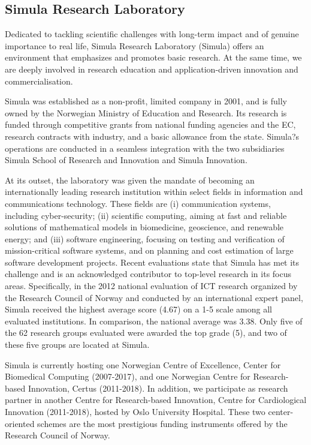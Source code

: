 \subsection*{Simula Research Laboratory}

Dedicated to tackling scientific challenges with long-term impact and of genuine importance to real life, Simula Research Laboratory (Simula) offers an environment that emphasizes and promotes basic research. At the same time, we are deeply involved in research education and application-driven innovation and commercialisation. 

Simula was established as a non-profit, limited company in 2001, and is fully owned by the Norwegian Ministry of Education and Research. Its research is funded through competitive grants from national funding agencies and the EC, research contracts with industry, and a basic allowance from the state.  Simula?s operations are conducted in a seamless integration with the two subsidiaries Simula School of Research and Innovation and Simula Innovation.

At its outset, the laboratory was given the mandate of becoming an internationally leading research institution within select fields in information and communications technology. These fields are (i) communication systems, including cyber-security; (ii) scientific computing, aiming at fast and reliable solutions of mathematical models in biomedicine, geoscience, and renewable energy; and (iii) software engineering, focusing on testing and verification of mission-critical software systems, and on planning and cost estimation of large software development projects. Recent evaluations state that Simula has met its challenge and is an acknowledged contributor to top-level research in its focus areas. Specifically, in the 2012 national evaluation of ICT research organized by the Research Council of Norway and conducted by an international expert panel, Simula received the highest average score (4.67) on a 1-5 scale among all evaluated institutions.  In comparison, the national average was 3.38. Only five of the 62 research groups evaluated were awarded the top grade (5), and two of these five groups are located at Simula.

Simula is currently hosting one Norwegian Centre of Excellence, Center for Biomedical Computing (2007-2017), and one Norwegian Centre for Research-based Innovation, Certus (2011-2018). In addition, we participate as research partner in another Centre for Research-based Innovation, Centre for Cardiological Innovation (2011-2018), hosted by Oslo University Hospital. These two center-oriented schemes are the most prestigious funding instruments offered by the Research Council of Norway. 

